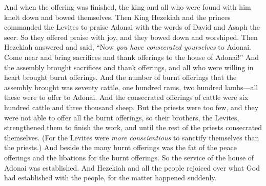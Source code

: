 \begin{biblechapter}
\verse And when the offering was finished, the king and all who were found with him knelt down and bowed themselves.
\verse Then King Hezekiah and the princes commanded the Levites to praise Adonai with the words of David and Asaph the seer. So they offered praise with joy, and they bowed down and worshiped.
\verse Then Hezekiah answered and said, “Now \textit{you have consecrated yourselves} to Adonai. Come near and bring sacrifices and thank offerings to the house of Adonai!” And the assembly brought sacrifices and thank offerings, and all who were willing in heart brought burnt offerings.
\verse And the number of burnt offerings that the assembly brought was seventy cattle, one hundred rams, two hundred lambs—all these were to offer to Adonai.
\verse And the consecrated offerings of cattle were six hundred cattle and three thousand sheep.
\verse But the priests were too few, and they were not able to offer all the burnt offerings, so their brothers, the Levites, strengthened them to finish the work, and until the rest of the priests consecrated themselves. (For the Levites were \textit{more conscientious} to sanctify themselves than the priests.)
\verse And beside the many burnt offerings was the fat of the peace offerings and the libations for the burnt offerings. So the service of the house of Adonai was established.
\verse And Hezekiah and all the people rejoiced over what God had established with the people, for the matter happened suddenly.
\end{biblechapter}

